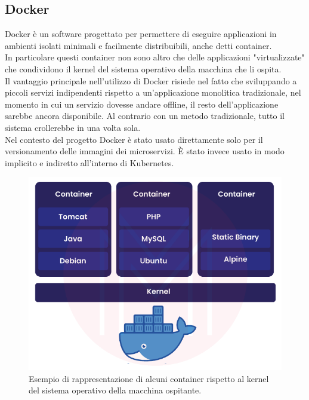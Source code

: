 \documentclass[a4paper,12pt]{report}
\begin{document}
\subsection{Docker}
Docker è un software progettato per permettere di eseguire applicazioni in ambienti isolati minimali e facilmente distribuibili, anche detti container. \cite{docker} \\
In particolare questi container non sono altro che delle applicazioni "virtualizzate" che condividono il kernel del sistema operativo della macchina che li ospita.\\
Il vantaggio principale nell'utilizzo di Docker risiede nel fatto che sviluppando a piccoli servizi indipendenti rispetto a un'applicazione monolitica tradizionale, nel momento in cui un servizio dovesse andare offline, il resto dell'applicazione sarebbe ancora disponibile. Al contrario con un metodo tradizionale, tutto il sistema crollerebbe in una volta sola.\\
Nel contesto del progetto Docker è stato usato direttamente solo per il versionamento delle immagini dei microservizi. È stato invece usato in modo implicito e indiretto all'interno di Kubernetes. \\ 
\begin{figure}[h]
	\includegraphics[width=1.0\textwidth]{docker}
    \caption{Esempio di rappresentazione di alcuni container rispetto al kernel del sistema operativo della macchina ospitante. \cite{dockerimg}}
    \label{fig:docker}
\end{figure}
\end{document}
